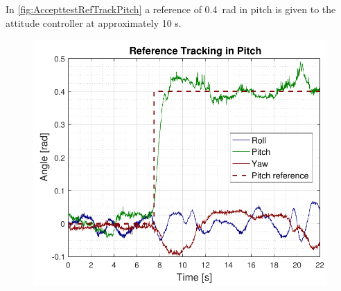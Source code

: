 In \autoref{fig:AccepttestRefTrackPitch} a reference of \SI{0.4}{rad} in pitch is given to the attitude controller at approximately 10 s.
\begin{figure}[H]
    \includegraphics[scale=.7]{figures/AccepttestRefTrackPitch.pdf}
    \centering			
    \label{fig:AccepttestRefTrackPitch}
\end{figure}

